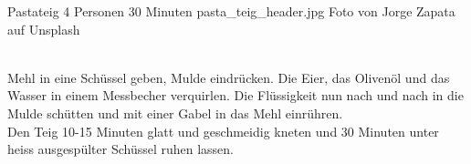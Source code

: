 \begin{myrecipe}
    {Pastateig}
    {4 Personen}
    {30 Minuten}
    {pasta_teig_header.jpg}
    {Foto von Jorge Zapata auf Unsplash}

    
    \freeform
    \\Mehl in eine Schüssel geben, Mulde eindrücken. Die Eier, das Olivenöl und das Wasser in einem Messbecher verquirlen. Die Flüssigkeit nun nach und nach in die Mulde schütten und mit einer Gabel in das Mehl einrühren.
    \\Den Teig 10-15 Minuten glatt und geschmeidig kneten und 30 Minuten unter heiss ausgespülter Schüssel ruhen lassen.
\end{myrecipe}
\clearpage
